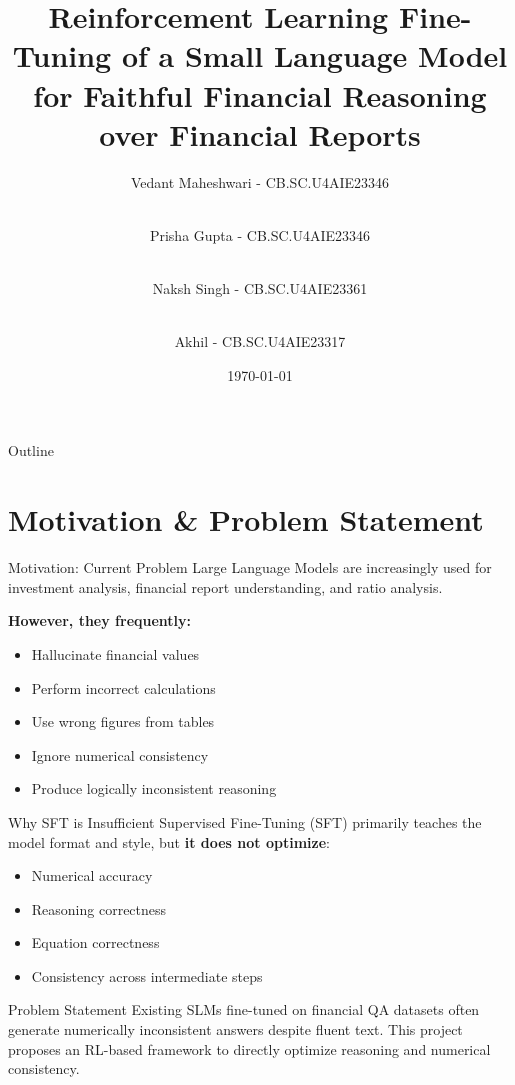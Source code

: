 \documentclass[aspectratio=169]{beamer}
\title[RL for Financial Reasoning]{Reinforcement Learning Fine-Tuning of a Small Language Model for Faithful Financial Reasoning over Financial Reports}
\author[Maheshwari et al.]{
    Vedant Maheshwari - CB.SC.U4AIE23346 \and \\
    Prisha Gupta - CB.SC.U4AIE23346 \and \\
    Naksh Singh - CB.SC.U4AIE23361 \and \\
    Akhil - CB.SC.U4AIE23317
}
\institute{Academic Project Presentation}
\date{\today}
\begin{document}
\begin{frame}
    \titlepage
\end{frame}

\begin{frame}{Outline}
    \tableofcontents
\end{frame}

\section{Motivation \& Problem Statement}
\begin{frame}{Motivation: Current Problem}
    Large Language Models are increasingly used for investment analysis, financial report understanding, and ratio analysis.
    
    \vspace{0.3cm}
    \textbf{However, they frequently:}
    \begin{itemize}
        \item Hallucinate financial values
        \item Perform incorrect calculations
        \item Use wrong figures from tables
        \item Ignore numerical consistency
        \item Produce logically inconsistent reasoning
    \end{itemize}
\end{frame}

\begin{frame}{Why SFT is Insufficient}
    Supervised Fine-Tuning (SFT) primarily teaches the model format and style, but \textbf{it does not optimize}:
    \begin{itemize}
        \item Numerical accuracy
        \item Reasoning correctness
        \item Equation correctness
        \item Consistency across intermediate steps
    \end{itemize}
    \vspace{0.3cm}
    \begin{block}{Problem Statement}
        Existing SLMs fine-tuned on financial QA datasets often generate numerically inconsistent answers despite fluent text. This project proposes an RL-based framework to directly optimize reasoning and numerical consistency.
    \end{block}
\end{frame}
\end{document}
